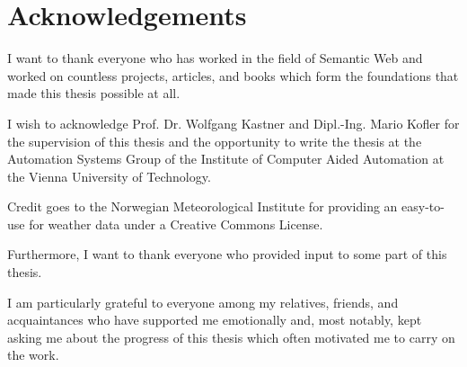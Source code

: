 \chapter*{Acknowledgements}

I want to thank everyone who has worked in the field of Semantic Web and worked on countless projects, articles, and books which form the foundations that made this thesis possible at all.

I wish to acknowledge Prof. Dr. Wolfgang Kastner and Dipl.-Ing. Mario Kofler for the supervision of this thesis and the opportunity to write the thesis at the Automation Systems Group of the Institute of Computer Aided Automation at the Vienna University of Technology.

Credit goes to the Norwegian Meteorological Institute for providing an easy-to-use  for weather data under a Creative Commons License.

Furthermore, I want to thank everyone who provided input to some part of this thesis.

I am particularly grateful to everyone among my relatives, friends, and acquaintances who have supported me emotionally and, most notably, kept asking me about the progress of this thesis which often motivated me to carry on the work.
